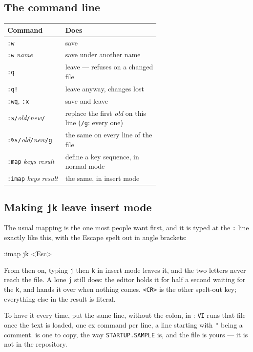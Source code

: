 \subsection*{The command line}
\begin{center}
\small
\begin{tabular}{@{}l >{\raggedright\arraybackslash}p{0.62\linewidth}@{}}
\toprule
\textbf{Command} & \textbf{Does} \\
\midrule
\texttt{:w} & save \\
\texttt{:w} \emph{name} & save under another name \\
\texttt{:q} & leave --- refuses on a changed file \\
\texttt{:q!} & leave anyway, changes lost \\
\texttt{:wq}, \texttt{:x} & save and leave \\
\texttt{:s/}\emph{old}\texttt{/}\emph{new}\texttt{/} & replace the first \emph{old} on this line (\texttt{/g}: every one) \\
\texttt{:\%s/}\emph{old}\texttt{/}\emph{new}\texttt{/g} & the same on every line of the file \\
\texttt{:map} \emph{keys} \emph{result} & define a key sequence, in normal mode \\
\texttt{:imap} \emph{keys} \emph{result} & the same, in insert mode \\
\bottomrule
\end{tabular}
\end{center}

\subsection*{Making \texttt{jk} leave insert mode}
The usual mapping is the one most people want first, and it is typed at
the \verb|:| line exactly like this, with the Escape spelt out in angle
brackets:

\begin{type}
:imap jk <Esc>
\end{type}

\noindent From then on, typing \verb|j| then \verb|k| in insert mode
leaves it, and the two letters never reach the file. A lone \verb|j|
still does: the editor holds it for half a second waiting for the
\verb|k|, and hands it over when nothing comes. \verb|<CR>| is the other
spelt-out key; everything else in the result is literal.

To have it every time, put the same line, without the colon, in
: \verb|VI| runs that file once the text is loaded,
one ex command per line, a line starting with \verb|"| being a comment.
 is one to copy, the way \texttt{STARTUP.SAMPLE}
is, and the file is yours --- it is not in the repository.

